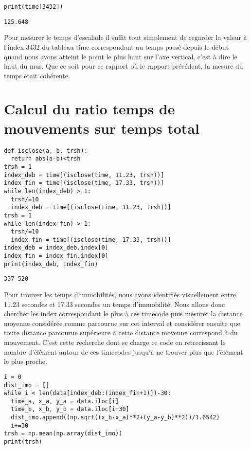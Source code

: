 \documentclass[11pt]{article}
\begin{document}
\begin{verbatim}
print(time[3432])
\end{verbatim}

\label{org9530bb4}
\begin{verbatim}
125.648
\end{verbatim}


Pour mesurer le temps d'escalade il suffit tout simplement de regarder la valeur à l'index 3432 du tableau time correspondant au temps passé depuis le
début quand nous avons atteint le point le plus haut sur l'axe vertical, c'est à dire le haut du mur. Que ce soit pour ce rapport où le rapport
précédent, la mesure du temps était cohérente.
\section{Calcul du ratio temps de mouvements sur temps total}
\label{sec:org4738a14}

\begin{verbatim}
def isclose(a, b, trsh):
  return abs(a-b)<trsh
trsh = 1
index_deb = time[(isclose(time, 11.23, trsh))]
index_fin = time[(isclose(time, 17.33, trsh))]
while len(index_deb) > 1:   
  trsh/=10
  index_deb = time[(isclose(time, 11.23, trsh))]
trsh = 1
while len(index_fin) > 1:
  trsh/=10
  index_fin = time[(isclose(time, 17.33, trsh))]
index_deb = index_deb.index[0]
index_fin = index_fin.index[0]
print(index_deb, index_fin)
\end{verbatim}

\label{org059da6b}
\begin{verbatim}
337 520
\end{verbatim}


Pour trouver les temps d'immobilités, nous avons identifiés visuellement entre 11.23 secondes et 17.33 secondes un temps d'immobilité. Nous allons
donc chercher les index correspondant le plus à ces timecode puis mesurer la distance moyenne considérée comme parcourue sur cet interval et
considérer ensuite que toute distance parcourue supérieure à cette distance moyenne correspond à du mouvement. C'est cette recherche dont se charge ce
code en retrecissant le nombre d'élément autour de ces timecodes jusqu'à ne trouver plus que l'élément le plus proche.

\begin{verbatim}
i = 0
dist_imo = []
while i < len(data[index_deb:(index_fin+1)])-30:
  time_a, x_a, y_a = data.iloc[i]
  time_b, x_b, y_b = data.iloc[i+30]
  dist_imo.append((np.sqrt((x_b-x_a)**2+(y_a-y_b)**2))/1.6542)
  i+=30
trsh = np.mean(np.array(dist_imo))
print(trsh)
\end{verbatim}
\end{document}

